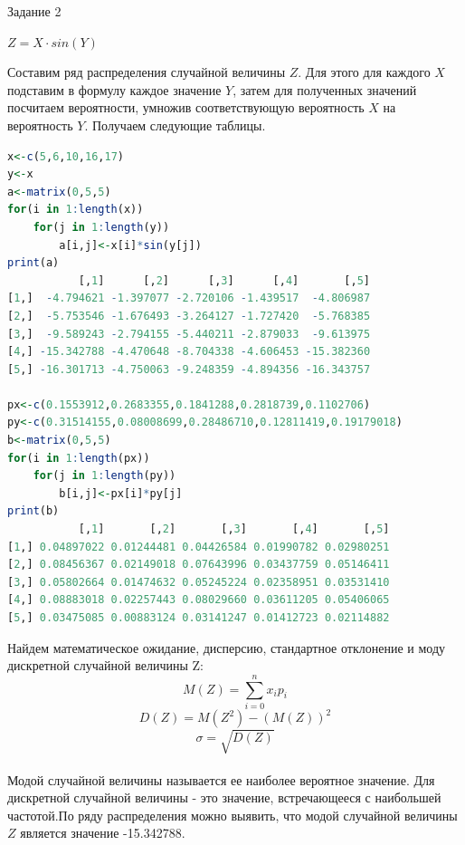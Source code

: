 \newpage
Задание 2\\
\begin{center}
 $Z = X\cdot sin(Y)$\\
 \end{center}
Составим ряд распределения случайной величины $Z$. Для этого для каждого $X$ подставим в формулу каждое значение $Y$, затем для полученных значений посчитаем вероятности, умножив соответствующую вероятность $X$ на вероятность $Y$. Получаем следующие таблицы.\\
\begin{lstlisting}[language=R,basicstyle=\normalsize]
x<-c(5,6,10,16,17)
y<-x
a<-matrix(0,5,5)
for(i in 1:length(x))
    for(j in 1:length(y))
        a[i,j]<-x[i]*sin(y[j])
print(a)
           [,1]      [,2]      [,3]      [,4]       [,5]
[1,]  -4.794621 -1.397077 -2.720106 -1.439517  -4.806987
[2,]  -5.753546 -1.676493 -3.264127 -1.727420  -5.768385
[3,]  -9.589243 -2.794155 -5.440211 -2.879033  -9.613975
[4,] -15.342788 -4.470648 -8.704338 -4.606453 -15.382360
[5,] -16.301713 -4.750063 -9.248359 -4.894356 -16.343757

px<-c(0.1553912,0.2683355,0.1841288,0.2818739,0.1102706)
py<-c(0.31514155,0.08008699,0.28486710,0.12811419,0.19179018)
b<-matrix(0,5,5)
for(i in 1:length(px))
    for(j in 1:length(py))
        b[i,j]<-px[i]*py[j]
print(b)
           [,1]       [,2]       [,3]       [,4]       [,5]
[1,] 0.04897022 0.01244481 0.04426584 0.01990782 0.02980251
[2,] 0.08456367 0.02149018 0.07643996 0.03437759 0.05146411
[3,] 0.05802664 0.01474632 0.05245224 0.02358951 0.03531410
[4,] 0.08883018 0.02257443 0.08029660 0.03611205 0.05406065
[5,] 0.03475085 0.00883124 0.03141247 0.01412723 0.02114882
\end{lstlisting}
Найдем математическое ожидание, дисперсию, стандартное отклонение и моду дискретной случайной величины Z:\\
$$M(Z)=\sum_{i=0}^{n}x_i p_i$$
$$D(Z)=M(Z^2)-(M(Z))^2$$
$$\sigma=\sqrt{D(Z)}$$\\
Модой случайной величины называется ее наиболее вероятное  значение. Для дискретной случайной величины - это значение, встречающееся с наибольшей частотой.По ряду распределения можно выявить, что модой случайной величины $Z$ является значение -15.342788.\\
